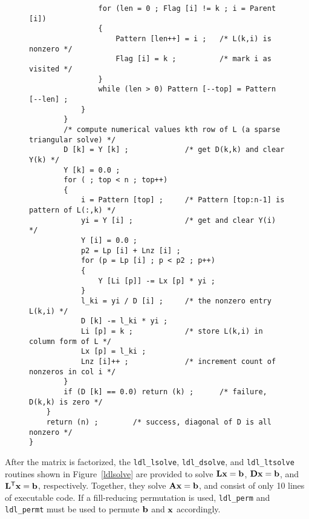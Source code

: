 \documentclass[12pt]{article}
\newcommand{\m}[1]{{\bf{#1}}}       %
\newcommand{\tr}{^{\sf T}}          %
\begin{document}
\begin{figure}
{\begin{verbatim}
                for (len = 0 ; Flag [i] != k ; i = Parent [i])
                {
                    Pattern [len++] = i ;   /* L(k,i) is nonzero */
                    Flag [i] = k ;          /* mark i as visited */
                }
                while (len > 0) Pattern [--top] = Pattern [--len] ;
            }
        }
        /* compute numerical values kth row of L (a sparse triangular solve) */
        D [k] = Y [k] ;             /* get D(k,k) and clear Y(k) */
        Y [k] = 0.0 ;
        for ( ; top < n ; top++)
        {
            i = Pattern [top] ;     /* Pattern [top:n-1] is pattern of L(:,k) */
            yi = Y [i] ;            /* get and clear Y(i) */
            Y [i] = 0.0 ;
            p2 = Lp [i] + Lnz [i] ;
            for (p = Lp [i] ; p < p2 ; p++)
            {
                Y [Li [p]] -= Lx [p] * yi ;
            }
            l_ki = yi / D [i] ;     /* the nonzero entry L(k,i) */
            D [k] -= l_ki * yi ;
            Li [p] = k ;            /* store L(k,i) in column form of L */
            Lx [p] = l_ki ;
            Lnz [i]++ ;             /* increment count of nonzeros in col i */
        }
        if (D [k] == 0.0) return (k) ;      /* failure, D(k,k) is zero */
    }
    return (n) ;        /* success, diagonal of D is all nonzero */
}
\end{verbatim}
}
\end{figure}

After the matrix is factorized, the {\tt ldl\_lsolve}, {\tt ldl\_dsolve},
and {\tt ldl\_ltsolve} routines shown in Figure~\ref{ldlsolve}
are provided to solve
$\m{Lx}=\m{b}$, $\m{Dx}=\m{b}$, and $\m{L}\tr\m{x}=\m{b}$, respectively.
Together, they solve $\m{Ax}=\m{b}$, and consist of only 10 lines of executable
code.  If a fill-reducing permutation is used,
{\tt ldl\_perm} and {\tt ldl\_permt} must be used to permute $\m{b}$ and
$\m{x}$ accordingly.
\end{document}
